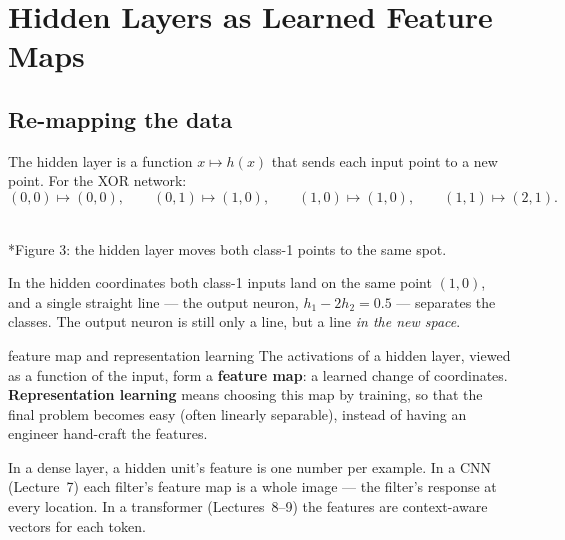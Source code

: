 \documentclass[11pt]{article}
\begin{document}
\section{Hidden Layers as Learned Feature Maps}
\subsection{Re-mapping the data}
The hidden layer is a function $x\mapsto h(x)$ that sends each input point to a new point. For the XOR network:
\[(0,0)\mapsto(0,0),\qquad(0,1)\mapsto(1,0),\qquad(1,0)\mapsto(1,0),\qquad(1,1)\mapsto(2,1).\]
\begin{center}\\*{\small\color{GreyN}Figure 3: the hidden layer moves both class-1 points to the same spot.}\end{center}
In the hidden coordinates both class-1 inputs land on the same point $(1,0)$, and a single straight line --- the output neuron, $h_1-2h_2=0.5$ --- separates the classes. The output neuron is still only a line, but a line \emph{in the new space}.
\begin{definition}{feature map and representation learning}
The activations of a hidden layer, viewed as a function of the input, form a \textbf{feature map}: a learned change of coordinates. \textbf{Representation learning} means choosing this map by training, so that the final problem becomes easy (often linearly separable), instead of having an engineer hand-craft the features.
\end{definition}
In a dense layer, a hidden unit's feature is one number per example. In a CNN (Lecture~7) each filter's feature map is a whole image --- the filter's response at every location. In a transformer (Lectures~8--9) the features are context-aware vectors for each token.
\end{document}
